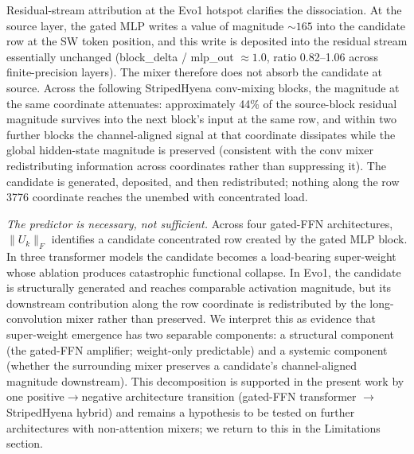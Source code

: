 \documentclass[11pt]{article}
\begin{document}
Residual-stream attribution at the Evo1 hotspot clarifies the
dissociation. At the source layer, the gated MLP writes a value of
magnitude $\sim 165$ into the candidate row at the SW token
position, and this write is deposited into the residual stream
essentially unchanged (block\_delta / mlp\_out
$\approx 1.0$, ratio 0.82--1.06 across finite-precision layers).
The mixer therefore does not absorb the candidate at source. Across
the following StripedHyena conv-mixing blocks, the magnitude at the
same coordinate attenuates: approximately 44\% of the source-block
residual magnitude survives into the next block's input at the same
row, and within two further blocks the channel-aligned signal at
that coordinate dissipates while the global hidden-state magnitude
is preserved (consistent with the conv mixer redistributing
information across coordinates rather than suppressing it). The
candidate is generated, deposited, and then redistributed; nothing
along the row 3776 coordinate reaches the unembed with concentrated
load.

\textit{The predictor is necessary, not sufficient.}
Across four gated-FFN architectures, $\|U_k\|_F$ identifies a
candidate concentrated row created by the gated MLP block. In three
transformer models the candidate becomes a load-bearing super-weight
whose ablation produces catastrophic functional collapse. In Evo1,
the candidate is structurally generated and reaches comparable
activation magnitude, but its downstream contribution along the row
coordinate is redistributed by the long-convolution mixer rather
than preserved. We interpret this as evidence that super-weight
emergence has two separable components: a structural component (the
gated-FFN amplifier; weight-only predictable) and a systemic
component (whether the surrounding mixer preserves a candidate's
channel-aligned magnitude downstream). This decomposition is
supported in the present work by one positive$\to$negative
architecture transition (gated-FFN transformer $\to$ StripedHyena
hybrid) and remains a hypothesis to be tested on further
architectures with non-attention mixers; we return to this in the
Limitations section.
\end{document}
